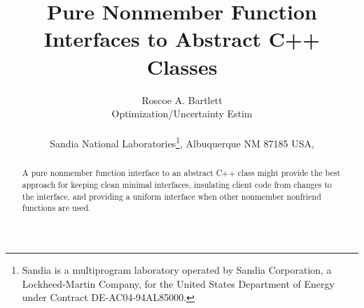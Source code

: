 \documentclass[pdf,ps2pdf,11pt]{SANDreport}
\title{\center
Pure Nonmember Function Interfaces to Abstract C++ Classes}
\author{
Roscoe A. Bartlett \\ Optimization/Uncertainty Estim \\ \\ Sandia National
Laboratories\footnote{ Sandia is a multiprogram laboratory operated by Sandia
Corporation, a Lockheed-Martin Company, for the United States Department of
Energy under Contract DE-AC04-94AL85000.}, Albuquerque NM 87185 USA, \\ }
\date{}
\begin{document}
\maketitle

%

%
\begin{abstract}
%
A pure nonmember function interface to an abstract C++ class might provide the
best approach for keeping clean minimal interfaces, insulating client code
from changes to the interface, and providing a uniform interface when other
nonmember nonfriend functions are used.
%
\end{abstract}
%

%
%
%

%
\clearpage
\tableofcontents


\end{document}
